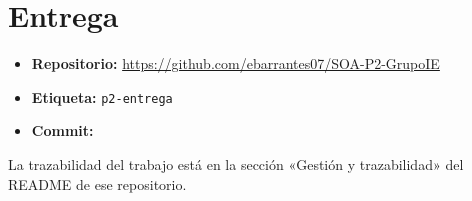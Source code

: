 \section*{Entrega}

\begin{itemize}
\item \textbf{Repositorio:} \url{https://github.com/ebarrantes07/SOA-P2-GrupoIE}
\item \textbf{Etiqueta:} \texttt{p2-entrega}
\item \textbf{Commit:} 
\end{itemize}

La trazabilidad del trabajo está en la sección «Gestión y trazabilidad» del
README de ese repositorio.
